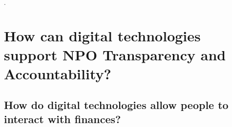 %
.
%
%
\section{How can digital technologies support NPO Transparency and Accountability?}



\subsection{How do digital technologies allow people to interact with finances?}%


